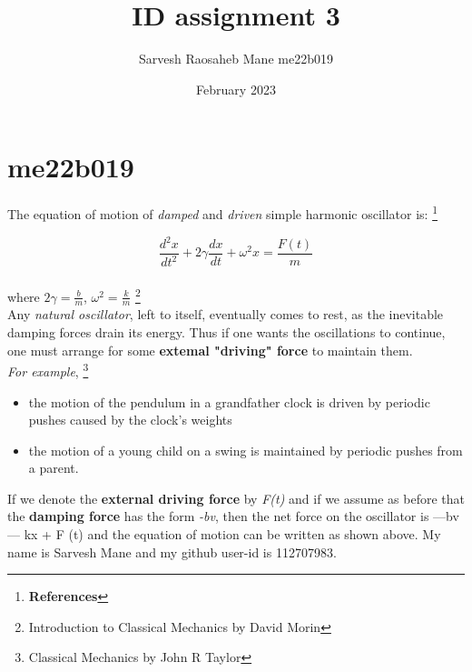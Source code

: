 

\title{ID assignment 3}
\author{Sarvesh Raosaheb Mane me22b019}
\date{February 2023}

\maketitle

\section{me22b019}
The equation of motion of \emph{damped} and \emph{driven} simple harmonic oscillator is:
\footnote{\textbf{References}}

\[\frac{d^2x}{dt^2} + 2\gamma\frac{dx}{dt} + \omega^2x = \frac{F(t)}{m} \] \\
where $2\gamma= \frac{b}{m}$, $\omega^2= \frac{k}{m}$
\footnote{Introduction to Classical
Mechanics by David Morin} \\

Any \emph{natural oscillator}, left to itself, eventually comes to rest, as the inevitable damping
forces drain its energy. Thus if one wants the oscillations to continue, one must arrange
for some \textbf{extemal "driving" force} to maintain them.\\
\textit{ For example},
\footnote{Classical Mechanics by John R Taylor}
\begin{itemize}
    \item the motion of the
pendulum in a grandfather clock is driven by periodic pushes caused by the clock's
weights

 \item the motion of a young child on a swing is maintained by periodic pushes
from a parent.
\end{itemize}
If we denote the \textbf{external driving force} by \textit{F(t)} and if we assume as
before that the \textbf{damping force} has the form \textit{-bv}, then the net force on the oscillator
is —bv — kx + F (t) and the equation of motion can be written as shown above.
My name is Sarvesh Mane and my github user-id is 112707983.







